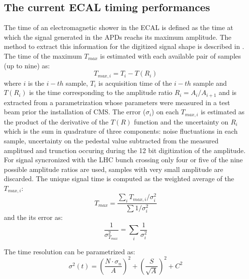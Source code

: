 
\subsection{The current ECAL timing performances}
\label{sec:ecal_time_run1}
The time of an electromagnetic shower in the ECAL is defined as the time at which the signal generated
in the APDs reachs its maximum amplitude. The method to extract this information for the digitized signal
shape is described in \cite{ecal_time_reco}. The time of the maximum $T_{max}$ is estimated with each
available pair of samples (up to nine) as:
\[
T_{max, i} = T_i - T(R_i)
\]
where $i$ is the $i-th$ sample, $T_i$ is acquisition time of the $i-th$ sample and $T(R_i)$ is the time
corresponding to the amplitude ratio $R_i = A_i/A_{i+1}$ and is extracted from a parametrization whose parameters
were measured in a test beam prior the installation of CMS. The error ($\sigma_i$) on each $T_{max, i}$ is estimated as
the product of the derivative of the $T(R)$ function and the uncertainty on $R_i$ which is the sum in quadrature
of three components: noise fluctuations in each sample, uncertainty on the pedestal value subtracted from the measured amplitued
and trunction occuring during the 12 bit digitization of the amplitude.
For signal syncronized with the LHC bunch crossing only four or five of the nine possible amplitude
ratios are used, samples with very small amplitude are discarded. The unique signal time is computed
as the weighted average of the  $T_{max, i}$:
\[
  T_{max} = \frac{\sum_i T_{max, i}/\sigma_i^2}{\sum 1/\sigma_i^2}
\]
and the its error as:
\[
  \frac{1}{\sigma_{T_{max}}^2} = \sum_i\frac{1}{\sigma_i^2}
\]

The time resolution can be parametrized as:
\begin{equation}
  \sigma^2(t) = \left( \frac{N\cdot\sigma_n}{A} \right)^2 + \left( \frac{S}{\sqrt{A}} \right)^2 + C^2  
\end{equation}
\label{eq:general_time_res}

